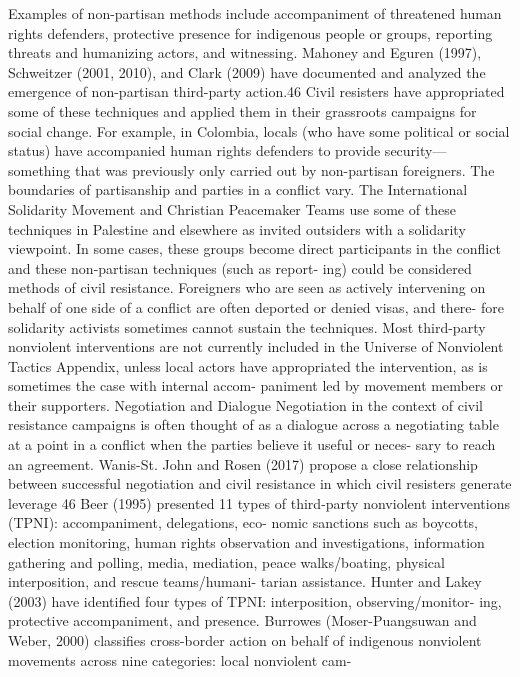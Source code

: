 \documentclass[twoside,a4paper,12pt,fleqn,openany]{extbook}
\begin{document}
Examples of non-partisan methods include accompaniment of threatened human rights
defenders, protective presence for indigenous people or groups, reporting threats and
humanizing actors, and witnessing. Mahoney and Eguren (1997), Schweitzer (2001, 2010), and
Clark (2009) have documented and analyzed the emergence of non-partisan third-party
action.46 Civil resisters have appropriated some of these techniques and applied them in their
grassroots campaigns for social change. For example, in Colombia, locals (who have some
political or social status) have accompanied human rights defenders to provide security—
something that was previously only carried out by non-partisan foreigners.
The boundaries of partisanship and parties in a conflict vary. The International Solidarity
Movement and Christian Peacemaker Teams use some of these techniques in Palestine and
elsewhere as invited outsiders with a solidarity viewpoint. In some cases, these groups
become direct participants in the conflict and these non-partisan techniques (such as report-
ing) could be considered methods of civil resistance. Foreigners who are seen as actively
intervening on behalf of one side of a conflict are often deported or denied visas, and there-
fore solidarity activists sometimes cannot sustain the techniques. Most third-party nonviolent
interventions are not currently included in the Universe of Nonviolent Tactics Appendix, unless
local actors have appropriated the intervention, as is sometimes the case with internal accom-
paniment led by movement members or their supporters.
Negotiation and Dialogue
Negotiation in the context of civil resistance campaigns is often thought of as a dialogue
across a negotiating table at a point in a conflict when the parties believe it useful or neces-
sary to reach an agreement. Wanis-St. John and Rosen (2017) propose a close relationship
between successful negotiation and civil resistance in which civil resisters generate leverage
46
Beer (1995) presented 11 types of third-party nonviolent interventions (TPNI): accompaniment, delegations, eco-
nomic sanctions such as boycotts, election monitoring, human rights observation and investigations, information
gathering and polling, media, mediation, peace walks/boating, physical interposition, and rescue teams/humani-
tarian assistance. Hunter and Lakey (2003) have identified four types of TPNI: interposition, observing/monitor-
ing, protective accompaniment, and presence. Burrowes (Moser-Puangsuwan and Weber, 2000) classifies
cross-border action on behalf of indigenous nonviolent movements across nine categories: local nonviolent cam-
\end{document}
